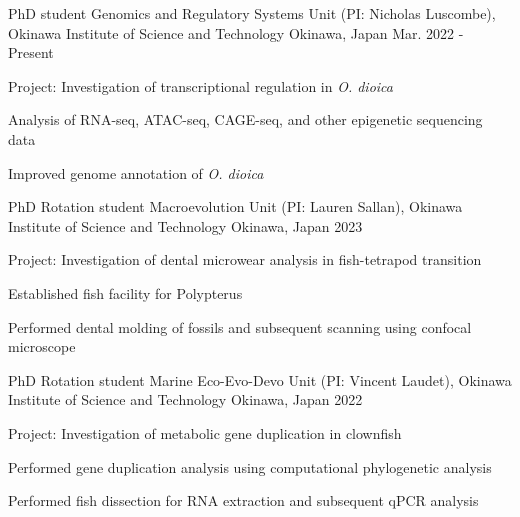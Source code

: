 

\begin{cventries}

  \cventry
    {PhD student} %
    {Genomics and Regulatory Systems Unit (PI: Nicholas Luscombe), Okinawa Institute of Science and Technology} %
    {Okinawa, Japan} %
    {Mar. 2022 - Present} %
    {
      \begin{cvitems} %
        \item {Project: Investigation of transcriptional regulation in \textit{O. dioica}}
        \item {Analysis of RNA-seq, ATAC-seq, CAGE-seq, and other epigenetic sequencing data}
        \item {Improved genome annotation of \textit{O. dioica}}
      \end{cvitems}
    }

  \cventry
    {PhD Rotation student} %
    {Macroevolution Unit (PI: Lauren Sallan), Okinawa Institute of Science and Technology} %
    {Okinawa, Japan} %
    {2023} %
    {
      \begin{cvitems} %
        \item {Project: Investigation of dental microwear analysis in fish-tetrapod transition}
        \item {Established fish facility for Polypterus}
        \item {Performed dental molding of fossils and subsequent scanning using confocal microscope}
      \end{cvitems}
    }

  \cventry
    {PhD Rotation student} %
    {Marine Eco-Evo-Devo Unit (PI: Vincent Laudet), Okinawa Institute of Science and Technology} %
    {Okinawa, Japan} %
    {2022} %
    {
      \begin{cvitems} %
        \item {Project: Investigation of metabolic gene duplication in clownfish}
        \item {Performed gene duplication analysis using computational phylogenetic analysis}
        \item {Performed fish dissection for RNA extraction and subsequent qPCR analysis}
      \end{cvitems}
    }


\end{cventries}
